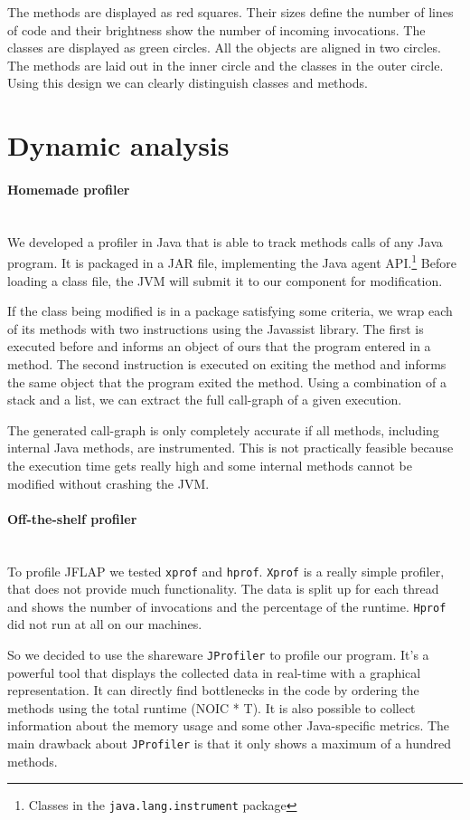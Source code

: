 \documentclass{paper}
\begin{document}
The methods are displayed as red squares. Their sizes define the number of lines of code and their brightness show the number of incoming invocations. The classes are displayed as green circles. All the objects are aligned in two circles. The methods are laid out in the inner circle and the classes in the outer circle. Using this design we can clearly distinguish classes and methods.

\section{Dynamic analysis}

\paragraph{Homemade profiler}\mbox{}\vspace{10pt}\\
We developed a profiler in Java that is able to track methods calls of any Java program. It is packaged in a JAR file, implementing the Java agent API.\footnote{Classes in the \texttt{java.lang.instrument} package} Before loading a class file, the JVM will submit it to our component for modification.


If the class being modified is in a package satisfying some criteria,  we wrap each of its methods with two instructions using the Javassist library. The first is executed before and informs an object of ours that the program entered in a method. The second instruction is executed on exiting the method and informs the same object that the program exited the method. Using a combination of a stack and a list, we can extract the full call-graph of a given execution.


The generated call-graph is only completely accurate if all methods, including internal Java methods, are instrumented. This is not practically feasible because the execution time gets really high and some internal methods cannot be modified without crashing the JVM.


\paragraph{Off-the-shelf profiler}\mbox{}\vspace{10pt}\\
To profile JFLAP we tested \texttt{xprof} and \texttt{hprof}. \texttt{Xprof} is a really simple profiler, that does not provide much functionality. The data is split up for each thread and shows the number of invocations and the percentage of the runtime. \texttt{Hprof} did not run at all on our machines.

So we decided to use the shareware \texttt{JProfiler} to profile our program. It's a powerful tool that displays the collected data in real-time with a graphical representation. It can directly find bottlenecks in the code by ordering the methods using the total runtime (NOIC * T). It is also possible to collect information about the memory usage and some other Java-specific metrics. The main drawback about \texttt{JProfiler} is that it only shows a maximum of a hundred methods.
\end{document}
